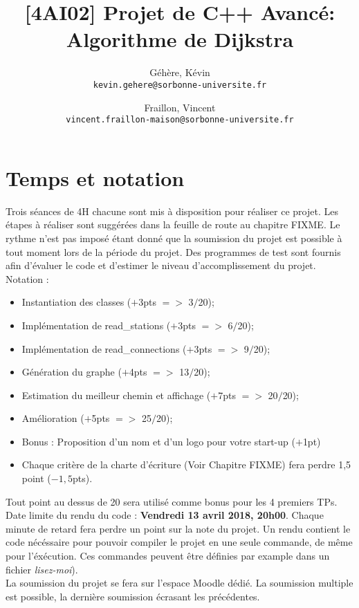 \documentclass[9pts]{article}
\title{[4AI02] Projet de C++ Avancé: Algorithme de Dijkstra}
\author{
  Géhère, Kévin\\
  \texttt{kevin.gehere@sorbonne-universite.fr}
  \and
  Fraillon, Vincent\\
  \texttt{vincent.fraillon-maison@sorbonne-universite.fr}
}
\begin{document}
\maketitle

\section{Temps et notation}

Trois séances de 4H chacune sont mis à disposition pour réaliser ce projet.
Les étapes à réaliser sont suggérées dans la feuille de route au chapitre FIXME. Le rythme n'est pas imposé étant donné que la soumission du projet est possible à tout moment lors de la période du projet.
Des programmes de test sont fournis afin d'évaluer le code et d'estimer le niveau d'accomplissement du projet.\\

Notation :
\begin{itemize}
\item Instantiation des classes ($+$3pts $=>$ 3$/$20);
\item Implémentation de read\_stations ($+$3pts $=>$ 6$/$20);
\item Implémentation de read\_connections ($+$3pts $=>$ 9$/$20);
\item Génération du graphe ($+$4pts $=>$ 13$/$20);
\item Estimation du meilleur chemin et affichage ($+$7pts $=>$ 20$/$20);
\item Amélioration ($+$5pts $=>$ 25$/$20);
\item Bonus : Proposition d'un nom et d'un logo pour votre start-up ($+$1pt)
\item Chaque critère de la charte d'écriture (Voir Chapitre FIXME) fera perdre 1,5 point ($-1,5$pts).\\
\end{itemize}

Tout point au dessus de 20 sera utilisé comme bonus pour les 4 premiers TPs.\\

Date limite du rendu du code : \textbf{Vendredi 13 avril 2018, 20h00}. Chaque minute de retard fera perdre un point sur la note du projet. Un rendu contient le code nécéssaire pour pouvoir compiler le projet en une seule commande, de même pour l'éxécution. Ces commandes peuvent être définies par example dans un fichier \emph{lisez-moi}). \\

La soumission du projet se fera sur l'espace Moodle dédié. La soumission multiple est possible, la dernière soumission écrasant les précédentes.
\end{document}
